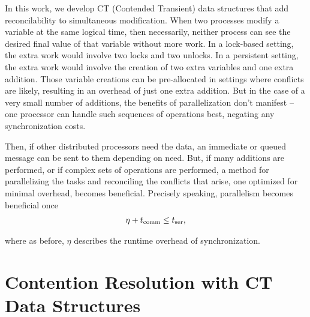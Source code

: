 In this work, we develop CT (Contended Transient) data structures that add
reconcilability to simultaneous modification. When two processes modify a
variable at the same logical time, then necessarily, neither process can see the
desired final value of that variable without more work. In a lock-based setting,
the extra work would involve two locks and two unlocks. In a persistent setting,
the extra work would involve the creation of two extra variables and one extra
addition. Those variable creations can be pre-allocated in settings where
conflicts are likely, resulting in an overhead of just one extra addition. But
in the case of a very small number of additions, the benefits of parallelization
don't manifest -- one processor can handle such sequences of operations best,
negating any synchronization costs.

Then, if other distributed processors need the data, an immediate or queued
message can be sent to them depending on need.  But, if many additions are
performed, or if complex sets of operations are performed, a method for
parallelizing the tasks and reconciling the conflicts that arise, one optimized
for minimal overhead, becomes beneficial. Precisely speaking, parallelism
becomes beneficial once
\begin{align*}
    \eta + t_\mathrm{comm} \leq t_\mathrm{ser} \text{,}
\end{align*}

where as before, $\eta$ describes the runtime overhead of synchronization.

\section{Contention Resolution with CT Data Structures}

